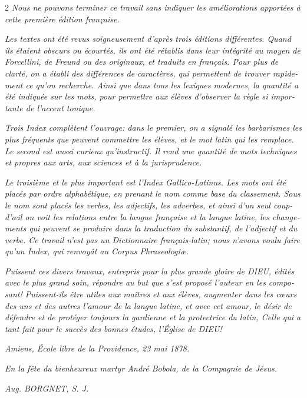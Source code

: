 \begin{otherlanguage}{french}
\begin{multicols}{2}
\textit{Nous ne pouvons terminer ce travail sans indiquer les améliorations apportées à cette première édition française.}

\textit{Les textes ont été revus soigneusement d’après trois éditions différentes. Quand ils étaient obscurs ou écourtés, ils ont été rétablis dans leur intégrité au moyen de Forcellini, de Freund ou des originaux, et traduits en français. Pour plus de clarté, on a établi des différences de caractères, qui permettent de trouver rapidement ce qu’on recherche. Ainsi que dans tous les lexiques modernes, la quantité a été indiquée sur les mots, pour permettre aux élèves d’observer la règle si importante de l’accent tonique.}

\textit{Trois Index complètent l’ouvrage: dans le premier, on a signalé les barbarismes les plus fréquents que peuvent commettre les élèves, et le mot latin qui les remplace. Le second est aussi curieux qu’instructif. Il rend une quantité de mots techniques et propres aux arts, aux sciences et à la jurisprudence.}

\textit{Le troisième et le plus important est l’Index Gallico-Latinus. Les mots ont été placés par ordre alphabétique, en prenant le nom comme base du classement. Sous le nom sont placés les verbes, les adjectifs, les adverbes, et ainsi d’un seul coup-d’œil on voit les relations entre la langue française et la langue latine, les changements qui peuvent se produire dans la traduction du substantif, de l’adjectif et du verbe. Ce travail n’est pas un Dictionnaire français-latin; nous n’avons voulu faire qu’un Index, qui renvoyât au Corpus Phraseologiæ.}

\textit{Puissent ces divers travaux, entrepris pour la plus grande gloire de DIEU, édités avec le plus grand soin, répondre au but que s’est proposé l’auteur en les composant! Puissent-ils être utiles aux maîtres et aux élèves, augmenter dans les cœurs des uns et des autres l’amour de la langue latine, et avec cet amour, le désir de défendre et de protéger toujours la gardienne et la protectrice du latin, Celle qui a tant fait pour le succès des bonnes études, l’Église de DIEU!}

\textit{ Amiens, École libre de la Providence, 23 mai 1878.}

\begin{center}\textit{En la fête du bienheureux martyr André Bobola, de la Compagnie de Jésus.}\end{center}

\begin{flushright}\textit{Aug. BORGNET, S. J.}\end{flushright}

\end{multicols}
\end{otherlanguage}